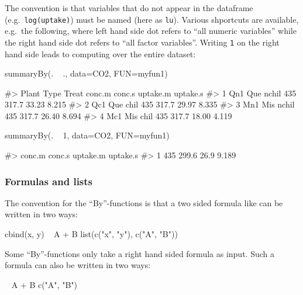 The convention is that variables that do not appear in the dataframe
(e.g.~\texttt{log(uptake)}) must be named (here as \texttt{lu}). Various
shportcuts are available, e.g.~the following, where left hand side dot
refers to ``all numeric variables'' while the right hand side dot refers
to ``all factor variables''. Writing \texttt{1} on the right hand side
leads to computing over the entire dataset:

\begin{Schunk}
\begin{Sinput}
summaryBy(. ~ ., data=CO2, FUN=myfun1)
\end{Sinput}
\begin{Soutput}
#>   Plant Type Treat conc.m conc.s uptake.m uptake.s
#> 1   Qn1  Que nchil    435  317.7    33.23    8.215
#> 2   Qc1  Que  chil    435  317.7    29.97    8.335
#> 3   Mn1  Mis nchil    435  317.7    26.40    8.694
#> 4   Mc1  Mis  chil    435  317.7    18.00    4.119
\end{Soutput}
\begin{Sinput}
summaryBy(. ~ 1, data=CO2, FUN=myfun1)
\end{Sinput}
\begin{Soutput}
#>   conc.m conc.s uptake.m uptake.s
#> 1    435  299.6     26.9    9.189
\end{Soutput}
\end{Schunk}

\hypertarget{formulas-and-lists}{%
\subsubsection{Formulas and lists}\label{formulas-and-lists}}

The convention for the ``By''-functions is that a two sided formula like
can be written in two ways:

\begin{Schunk}
\begin{Sinput}
cbind(x, y) ~ A + B
list(c("x", "y"), c("A", "B"))
\end{Sinput}
\end{Schunk}

Some ``By''-functions only take a right hand sided formula as input.
Such a formula can also be written in two ways:

\begin{Schunk}
\begin{Sinput}
~ A + B
c("A", "B")
\end{Sinput}
\end{Schunk}

